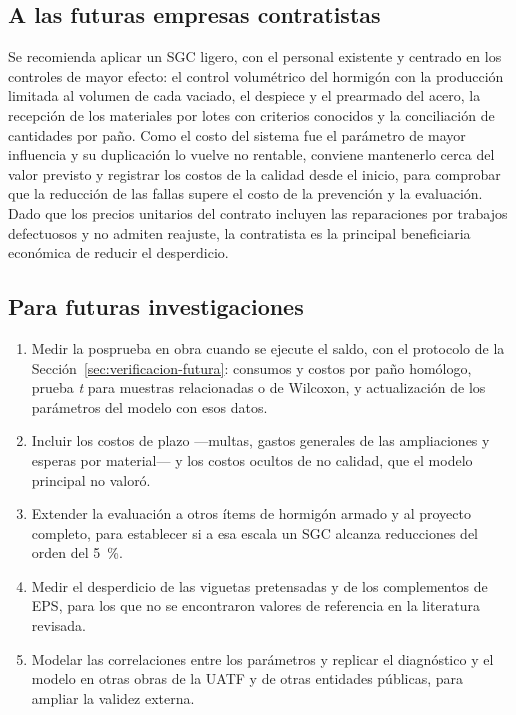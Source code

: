 \subsection{A las futuras empresas contratistas}
Se recomienda aplicar un SGC ligero, con el personal existente y centrado en los controles de mayor efecto: el control volumétrico del hormigón con la producción limitada al volumen de cada vaciado, el despiece y el prearmado del acero, la recepción de los materiales por lotes con criterios conocidos y la conciliación de cantidades por paño. Como el costo del sistema fue el parámetro de mayor influencia y su duplicación lo vuelve no rentable, conviene mantenerlo cerca del valor previsto y registrar los costos de la calidad desde el inicio, para comprobar que la reducción de las fallas supere el costo de la prevención y la evaluación. Dado que los precios unitarios del contrato incluyen las reparaciones por trabajos defectuosos y no admiten reajuste, la contratista es la principal beneficiaria económica de reducir el desperdicio.

\subsection{Para futuras investigaciones}
\begin{enumerate}[label=(\arabic*)]
  \item Medir la posprueba en obra cuando se ejecute el saldo, con el protocolo de la Sección~\ref{sec:verificacion-futura}: consumos y costos por paño homólogo, prueba \emph{t} para muestras relacionadas o de Wilcoxon, y actualización de los parámetros del modelo con esos datos.
  \item Incluir los costos de plazo ---multas, gastos generales de las ampliaciones y esperas por material--- y los costos ocultos de no calidad, que el modelo principal no valoró.
  \item Extender la evaluación a otros ítems de hormigón armado y al proyecto completo, para establecer si a esa escala un SGC alcanza reducciones del orden del 5~\%.
  \item Medir el desperdicio de las viguetas pretensadas y de los complementos de EPS, para los que no se encontraron valores de referencia en la literatura revisada.
  \item Modelar las correlaciones entre los parámetros y replicar el diagnóstico y el modelo en otras obras de la UATF y de otras entidades públicas, para ampliar la validez externa.
\end{enumerate}


